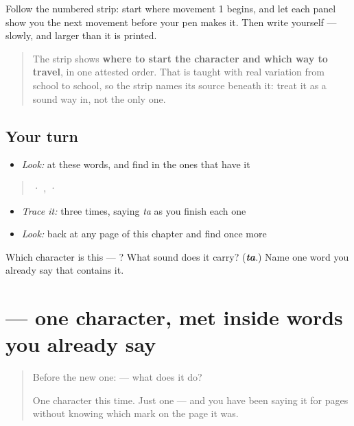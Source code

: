 Follow the numbered strip: start where movement 1 begins, and let each panel show you the next movement before your pen makes it. Then write  yourself — slowly, and larger than it is printed.

\begin{quote}
The strip shows \textbf{where to start the character and which way to travel}, in one attested order. That is taught with real variation from school to school, so the strip names its source beneath it: treat it as a sound way in, not the only one.
\end{quote}

\subsection*{Your turn}
\begin{itemize}
\raggedright
  \item \emph{Look:} at these words, and find  in the ones that have it
\end{itemize}

\begin{quote}
  ·  ,   ·  
\end{quote}

\begin{itemize}
\raggedright
  \item \emph{Trace it:}  three times, saying \emph{ta} as you finish each one
  \item \emph{Look:} back at any page of this chapter and find  once more
\end{itemize}

\begin{tcolorbox}[breakable,colback=teal!4,colframe=teal!35!black,title={Before you move on}]
Which character is this — ? What sound does it carry? (\emph{\textbf{ta}}.) Name one word you already say that contains it.
\end{tcolorbox}
\section[\texorpdfstring{\hi{ी} (ī)}{ी (ī)}]{ — one character, met inside words you already say}

\label{lesson:HI-S116-vowel-sign-ii}



\begin{quote}
Before the new one:  — what does it do?

One character this time. Just one — and you have been saying it for pages without knowing which mark on the page it was.
\end{quote}

